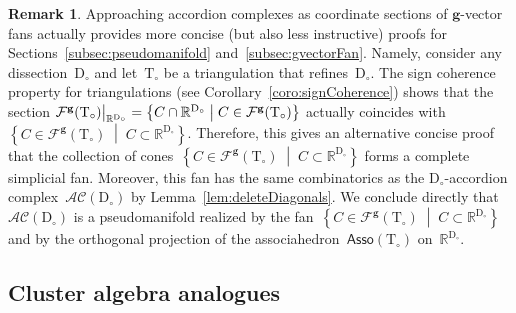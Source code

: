 \documentclass{amsart}
\theoremstyle{definition}
\newtheorem{remark}[theorem]{Remark}
\newcommand{\R}{\mathbb{R}} %
\renewcommand{\b}[1]{\mathbf{#1}} %
\newcommand{\set}[2]{\left\{ #1 \;\middle|\; #2 \right\}} %
\newcommand{\Asso}{\mathsf{Asso}} %
\newcommand{\Para}{\mathsf{Para}} %
\newcommand{\ie}{\textit{i.e.}~} %
\newcommand{\accordionComplex}{\mathcal{AC}} %
\newcommand{\triangulation}{\mathrm{T}} %
\newcommand{\dissection}{\mathrm{D}} %
\newcommand{\gvectorFan}{\mathcal{F}^\mathbf{g}} %
\renewcommand{\restriction}[2]{\left.\kern-\nulldelimiterspace #1 \vphantom{\big|} \right|_{#2}}
\begin{document}
\begin{remark}
\label{rem:simplerProofs}
Approaching accordion complexes as coordinate sections of $\b{g}$-vector fans actually provides more concise (but also less instructive) proofs for Sections~\ref{subsec:pseudomanifold} and~\ref{subsec:gvectorFan}. Namely, consider any dissection~$\dissection_\circ$ and let~$\triangulation_\circ$ be a triangulation that refines~$\dissection_\circ$. 
The sign coherence property for triangulations (see Corollary~\ref{coro:signCoherence}) shows that the section $\restriction{\gvectorFan(\triangulation_\circ)}{\R^{\dissection_\circ}} = \set{C \cap \R^{\dissection_\circ}}{C \in \gvectorFan(\triangulation_\circ)}$ actually coincides with~$\set{C \in \gvectorFan(\triangulation_\circ)}{C \subset \R^{\dissection_\circ}}$. Therefore, this gives an alternative concise proof that the collection of cones~$\set{C \in \gvectorFan(\triangulation_\circ)}{C \subset \R^{\dissection_\circ}}$ forms a complete simplicial fan. Moreover, this fan has the same combinatorics as the $\dissection_\circ$-accordion complex~$\accordionComplex(\dissection_\circ)$ by Lemma~\ref{lem:deleteDiagonals}. We conclude directly that~$\accordionComplex(\dissection_\circ)$ is a pseudomanifold realized by the fan~$\set{C \in \gvectorFan(\triangulation_\circ)}{C \subset \R^{\dissection_\circ}}$ and by the orthogonal projection of the associahedron~$\Asso(\triangulation_\circ)$ on~$\R^{\dissection_\circ}$.
\end{remark}

\subsection{Cluster algebra analogues}
\label{subsec:clusterAlgebras}
\end{document}
